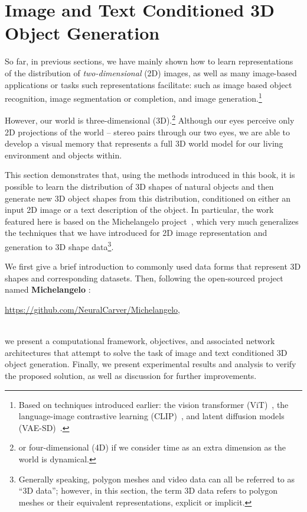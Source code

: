 \documentclass[../../book-main.tex]{subfiles}
\begin{document}
\section{Image and Text Conditioned 3D Object Generation}
\label{sec:Michelangelo}\label{sec:object-generation}

So far, in previous sections, we have mainly shown how to learn
representations of the distribution of {\em two-dimensional} (2D)
images, as well as many image-based applications or tasks such
representations facilitate: such as image based object recognition,
image segmentation or completion, and image
generation.\footnote{Based on techniques introduced earlier: the
vision transformer (ViT)~\cite{NIPS2017_3f5ee243}, the language-image
contrastive learning (CLIP)~\cite{pmlr-v139-radford21a}, and latent
diffusion models (VAE-SD)~\cite{rombach2022high}.}

However, our world is three-dimensional (3D).\footnote{or
four-dimensional (4D) if we consider time as an extra dimension as
the world is dynamical.} Although our eyes perceive only  2D
projections of the world -- stereo pairs through our two eyes, we are
able to develop a visual memory that represents a full 3D world model
for our living environment and objects within.

This section demonstrates that, using the methods introduced in this
book, it is possible to learn the distribution of 3D shapes of
natural objects and then generate new 3D object shapes from this
distribution, conditioned on either an input 2D image or a text
description of the object. In particular, the work featured here is
based on the Michelangelo project~\cite{NEURIPS2023_ea1a7f7b}, which
very much generalizes the techniques that we have introduced for 2D
image representation and generation to 3D shape
data\footnote{Generally speaking, polygon meshes and video data can
all be referred to as ``3D data''; however, in this section, the term
3D data refers to polygon meshes or their equivalent representations,
explicit or implicit.}.

We first give a brief introduction to commonly used data forms that
represent 3D shapes and corresponding datasets. Then, following the
open-sourced project named \textbf{Michelangelo}  \cite{NEURIPS2023_ea1a7f7b}:\\
\centerline{\url{https://github.com/NeuralCarver/Michelangelo},}\\
we present a computational framework, objectives, and associated
network architectures that attempt to solve the task of image and
text conditioned 3D object generation. Finally, we present
experimental results and analysis to verify the proposed solution, as
well as discussion for further improvements.
\end{document}
